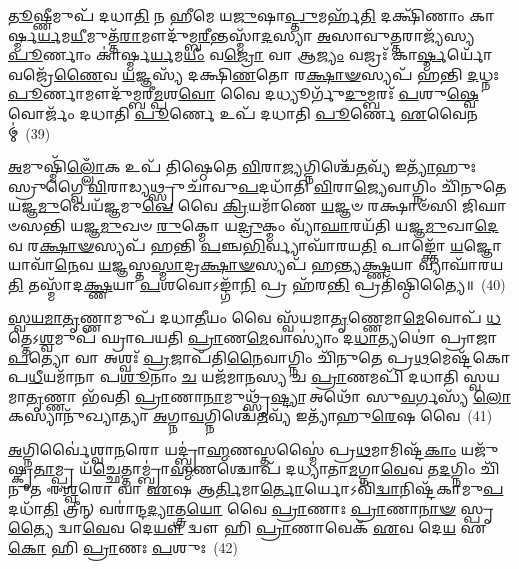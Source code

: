 \-\ul{𑌤𑍂}\-𑌷𑍍𑌣𑍀𑌮𑍁𑌪᳴ 𑌦𑌧𑌾\-\ul{𑌤𑌿} 𑌨 𑌹𑍀𑌮𑍇 𑌯\-\ul{𑌜𑍁}\-𑌷𑌾\-\ul{𑌪𑍍𑌤𑍁}\-𑌮𑌰𑍍\mbox{}𑌹᳴\-\ul{𑌤𑌿} 𑌦𑌕𑍍𑌷𑌿᳴𑌣𑌾𑌂 𑌕𑌾𑌰𑍍𑌷𑍍𑌮\-\ul{𑌰𑍍𑌯}\-𑌮\-\ul{𑌯𑍀}\-𑌮𑍁𑌤𑍍𑌤᳴\-\ul{𑌰𑌾}\-𑌮𑍗𑌦𑍁᳴𑌮𑍍𑌬\-\ul{𑌰𑍀}\-𑌨𑍍𑌤𑌸𑍍𑌮𑌾᳴\-\ul{𑌦}\-𑌸𑍍𑌯𑌾 \ul{𑌅}\-𑌸𑌾𑌵𑍁\-\ul{𑌤𑍍𑌤}\-𑌰𑌾𑌜𑍍𑌯᳴𑌸𑍍𑌯 \ul{𑌪𑍂}\-𑌰𑍍𑌣𑌾𑌂 𑌕𑌾॑𑌰𑍍𑌷𑍍𑌮\-\ul{𑌰𑍍𑌯}\-𑌮\-\ul{𑌯𑍀𑌂} 𑌵\-\ul{𑌜𑍍𑌰𑍋} 𑌵𑌾 𑌆\-\ul{𑌜𑍍𑌯𑌂} 𑌵𑌜𑍍𑌰𑌃᳴ 𑌕𑌾\-\ul{𑌰𑍍𑌷𑍍𑌮}\-𑌰𑍍𑌯𑍋᳴ 𑌵𑌜𑍍𑌰𑍇᳴\-\ul{𑌣𑍈}\-𑌵 \ul{𑌯}\-𑌜𑍍𑌞𑌸𑍍𑌯᳴ 𑌦𑌕𑍍𑌷𑌿\-\ul{𑌣}\-𑌤𑍋 𑌰\-\ul{𑌕𑍍𑌷𑌾}\-\-\ul{𑍟}\-𑌸𑍍𑌯𑌪᳴ 𑌹𑌨𑍍𑌤𑌿 \ul{𑌦}\-𑌧𑍍𑌨𑌃 \ul{𑌪𑍂}\-𑌰𑍍𑌣𑌾𑌮𑍗𑌦𑍁᳴𑌮𑍍𑌬𑌰𑍀\-\ul{𑌮𑍍𑌪}\-𑌶\-\ul{𑌵𑍋} 𑌵𑍈 𑌦𑌧𑍍𑌯𑍂𑌰𑍍𑌗𑍁᳴\-\ul{𑌦𑍁}\-𑌮𑍍𑌬𑌰𑌃᳴ \ul{𑌪}\-𑌶𑍁\-\ul{𑌷𑍍𑌵𑍇}\-𑌵𑍋𑌰𑍍𑌜𑌂᳴ 𑌦𑌧𑌾𑌤𑌿 \ul{𑌪𑍂}\-𑌰𑍍𑌣𑍇 𑌉𑌪᳴ 𑌦𑌧𑌾𑌤𑌿 \ul{𑌪𑍂}\-𑌰𑍍𑌣𑍇 \ul{𑌏}\-𑌵𑍈𑌨𑌮𑍍॑~(39)

\-\ul{𑌅}\-𑌮𑍁𑌷𑍍𑌮𑌿᳴\-\ul{𑌲𑍍𑌲𑍋𑌁}\-𑌕 𑌉𑌪᳴ 𑌤𑌿𑌷𑍍𑌠𑍇𑌤𑍇 \ul{𑌵𑌿}\-𑌰𑌾\-\ul{𑌜𑍍𑌯}\-𑌗𑍍𑌨𑌿𑌶𑍍𑌚𑍇᳴\-\ul{𑌤}\-𑌵𑍍𑌯᳴ 𑌇\-\ul{𑌤𑍍𑌯𑌾}\-᳴𑌹𑍁𑌃 𑌸𑍍𑌰𑍁𑌗𑍍𑌵𑍈 \ul{𑌵𑌿}\-𑌰𑌾𑌡𑍍𑌯𑌥𑍍𑌸𑍍𑌰𑍁𑌚𑌾᳴𑌵𑍁\-\ul{𑌪}\-𑌦𑌧𑌾᳴𑌤𑌿 \ul{𑌵𑌿}\-𑌰𑌾\-\ul{𑌜𑍍𑌯𑍇}\-𑌵𑌾𑌗𑍍𑌨𑌿𑌂 𑌚𑌿᳴𑌨𑍁𑌤𑍇 𑌯𑌜𑍍𑌞\-\ul{𑌮𑍁}\-𑌖𑍇𑌯᳴𑌜𑍍𑌞𑌮𑍁\-\ul{𑌖𑍇} 𑌵𑍈 \ul{𑌕𑍍𑌰𑌿}\-𑌯𑌮𑌾᳴𑌣𑍇 \ul{𑌯}\-𑌜𑍍𑌞𑍞 𑌰𑌕𑍍𑌷𑌾𑍞᳴𑌸𑌿 𑌜𑌿𑌘𑌾𑍞𑌸𑌨𑍍𑌤𑌿 𑌯𑌜𑍍𑌞\-\ul{𑌮𑍁}\-𑌖𑍞 \ul{𑌰𑍁}\-𑌕𑍍𑌮𑍋 𑌯\-\ul{𑌦𑍍𑌰𑍁}\-𑌕𑍍𑌮𑌂 𑌵𑍍𑌯𑌾᳴\-\ul{𑌘𑌾}\-𑌰𑌯᳴𑌤𑌿 𑌯𑌜𑍍𑌞\-\ul{𑌮𑍁}\-𑌖𑌾\-\ul{𑌦𑍇}\-𑌵 𑌰\-\ul{𑌕𑍍𑌷𑌾}\-\-\ul{𑍟}\-𑌸𑍍𑌯𑌪᳴ 𑌹𑌨𑍍𑌤𑌿 \ul{𑌪}\-𑌞𑍍𑌚\-\ul{𑌭𑌿}\-𑌰𑍍𑌵𑍍𑌯𑌾𑌘𑌾᳴𑌰𑌯\-\ul{𑌤𑌿} 𑌪𑌾𑌙𑍍𑌕𑍍𑌤𑍋᳴ \ul{𑌯}\-𑌜𑍍𑌞𑍋 𑌯𑌾𑌵𑌾᳴\-\ul{𑌨𑍇}\-𑌵 \ul{𑌯}\-𑌜𑍍𑌞𑌸𑍍𑌤\-\ul{𑌸𑍍𑌮𑌾}\-𑌦𑍍𑌰\-\ul{𑌕𑍍𑌷𑌾}\-\-\ul{𑍟}\-𑌸𑍍𑌯𑌪᳴ 𑌹𑌨𑍍𑌤𑍍𑌯\-\ul{𑌕𑍍𑌷𑍍𑌣}\-𑌯𑌾 𑌵𑍍𑌯𑌾𑌘𑌾᳴𑌰𑌯\-\ul{𑌤𑌿} 𑌤𑌸𑍍𑌮𑌾᳴𑌦\-\ul{𑌕𑍍𑌷𑍍𑌣}\-𑌯𑌾 \ul{𑌪}\-𑌶𑌵𑍋\-𑌽𑌙𑍍𑌗𑌾᳴\-\ul{𑌨𑌿} 𑌪𑍍𑌰 𑌹᳴𑌰\-\ul{𑌨𑍍𑌤𑌿} 𑌪𑍍𑌰𑌤𑌿᳴𑌷𑍍𑌠𑌿𑌤𑍍𑌯𑍈॥~(40)

{\anuvakamend[{𑌵\-\ul{𑌨}\-𑌸𑍍𑌪𑌤᳴𑌯𑍋 𑌦𑌕𑍍𑌷𑌿\-\ul{𑌣}\-𑌤𑍋 𑌧᳴𑌤𑍍𑌤 𑌏\-\ul{𑌨}\-𑌨𑍍𑌤𑌸𑍍𑌮𑌾᳴𑌦\-\ul{𑌕𑍍𑌷𑍍𑌣}\-𑌯𑌾 𑌪𑌞𑍍𑌚᳴ 𑌚}]}%

\-\ul{𑌸𑍍𑌵}\-\-\ul{𑌯}\-\-\ul{𑌮𑌾}\-\-\ul{𑌤𑍃}\-𑌣𑍍𑌣𑌾𑌮𑍁𑌪᳴ 𑌦𑌧𑌾\-\ul{𑌤𑍀}\-𑌯𑌂 𑌵𑍈 𑌸𑍍𑌵᳴𑌯𑌮𑌾\-\ul{𑌤𑍃}\-𑌣𑍍𑌣𑍇𑌮𑌾\-\ul{𑌮𑍇}\-𑌵𑍋𑌪᳴ \ul{𑌧}\-𑌤𑍍𑌤𑍇\-𑌽\-\ul{𑌶𑍍𑌵}\-𑌮𑍁𑌪᳴ 𑌘𑍍𑌰𑌾𑌪𑌯𑌤𑌿 \ul{𑌪𑍍𑌰𑌾}\-𑌣\-\ul{𑌮𑍇}\-𑌵𑌾𑌸𑍍𑌯𑌾𑌂॑ 𑌦\-\ul{𑌧𑌾}\-𑌤𑍍𑌯𑌥𑍋॑ 𑌪𑍍𑌰𑌾𑌜𑌾\-\ul{𑌪}\-𑌤𑍍𑌯𑍋 𑌵𑌾 𑌅𑌶𑍍𑌵𑌃᳴ \ul{𑌪𑍍𑌰}\-𑌜𑌾𑌪᳴𑌤𑌿\-\ul{𑌨𑍈}\-𑌵𑌾𑌗𑍍𑌨𑌿𑌂 𑌚𑌿᳴𑌨𑍁𑌤𑍇 𑌪𑍍𑌰\-\ul{𑌥}\-𑌮𑍇𑌷𑍍𑌟᳴𑌕𑍋𑌪\-\ul{𑌧𑍀}\-𑌯𑌮𑌾᳴𑌨𑌾 𑌪\-\ul{𑌶𑍂}\-𑌨𑌾𑌂 \ul{𑌚} 𑌯𑌜᳴𑌮𑌾𑌨𑌸𑍍𑌯 𑌚 \ul{𑌪𑍍𑌰𑌾}\-𑌣𑌮𑌪𑌿᳴ 𑌦𑌧𑌾𑌤𑌿 𑌸𑍍𑌵𑌯𑌮𑌾\-\ul{𑌤𑍃}\-𑌣𑍍𑌣𑌾 𑌭᳴𑌵𑌤𑌿 \ul{𑌪𑍍𑌰𑌾}\-𑌣𑌾\-\ul{𑌨𑌾}\-𑌮𑍁𑌥𑍍𑌸𑍃᳴\-\ul{𑌷𑍍𑌟𑍍𑌯𑌾} 𑌅𑌥𑍋᳴ 𑌸𑍁\-\ul{𑌵}\-𑌰𑍍𑌗𑌸𑍍𑌯᳴ \ul{𑌲𑍋}\-𑌕𑌸𑍍𑌯𑌾𑌨𑍁᳴𑌖𑍍𑌯𑌾𑌤𑍍𑌯𑌾 \ul{𑌅}\-𑌗𑍍𑌨𑌾\-\ul{𑌵}\-𑌗𑍍𑌨𑌿𑌶𑍍𑌚𑍇᳴\-\ul{𑌤}\-𑌵𑍍𑌯᳴ 𑌇𑌤𑍍𑌯𑌾᳴𑌹𑍁\-\ul{𑌰𑍇}\-𑌷 𑌵𑍈~(41)

\-\ul{𑌅}\-𑌗𑍍𑌨𑌿𑌰𑍍𑌵𑍈॑𑌶𑍍𑌵𑌾\-\ul{𑌨}\-𑌰𑍋 𑌯𑌦𑍍𑌬𑍍𑌰𑌾॑\-\ul{𑌹𑍍𑌮}\-𑌣𑌸𑍍𑌤𑌸𑍍𑌮𑍈॑ 𑌪𑍍𑌰\-\ul{𑌥}\-𑌮𑌾𑌮𑌿𑌷𑍍𑌟᳴\-\ul{𑌕𑌾𑌂} 𑌯𑌜𑍁᳴𑌷𑍍𑌕𑍃\-\ul{𑌤𑌾}\-𑌮𑍍𑌪𑍍𑌰 𑌯᳴\-\ul{𑌚𑍍𑌛𑍇}\-𑌤𑍍𑌤𑌾𑌮𑍍𑌬𑍍𑌰𑌾॑\-\ul{𑌹𑍍𑌮}\-𑌣𑌶𑍍𑌚𑍋𑌪᳴ 𑌦𑌧𑍍𑌯𑌾𑌤𑌾\-\ul{𑌮}\-𑌗𑍍𑌨𑌾\-\ul{𑌵𑍇}\-𑌵 𑌤\-\ul{𑌦}\-𑌗𑍍𑌨𑌿𑌂 𑌚𑌿᳴𑌨𑍁𑌤 𑌈\-\ul{𑌶𑍍𑌵}\-𑌰𑍋 𑌵𑌾 \ul{𑌏}\-𑌷 𑌆\-\ul{𑌰𑍍𑌤𑌿}\-𑌮𑌾\-\ul{𑌰𑍍𑌤𑍋}\-𑌰𑍍𑌯𑍋\-𑌽𑌵𑌿᳴\-\ul{𑌦𑍍𑌵𑌾}\-𑌨𑌿𑌷𑍍𑌟᳴𑌕𑌾𑌮𑍁\-\ul{𑌪}\-𑌦𑌧𑌾᳴\-\ul{𑌤𑌿} 𑌤𑍍𑌰𑍀𑌨𑍍 𑌵𑌰𑌾॑𑌨𑍍𑌦\-\ul{𑌦𑍍𑌯𑌾}\-𑌤𑍍𑌤𑍍𑌰\-\ul{𑌯𑍋} 𑌵𑍈 \ul{𑌪𑍍𑌰𑌾}\-𑌣𑌾𑌃 \ul{𑌪𑍍𑌰𑌾}\-𑌣𑌾\-\ul{𑌨𑌾}\-\-\ul{𑍟} 𑌸𑍍𑌪𑍃\-\ul{𑌤𑍍𑌯𑍈} 𑌦𑍍𑌵𑌾\-\ul{𑌵𑍇}\-𑌵 𑌦𑍇\-\ul{𑌯𑍗} 𑌦𑍍𑌵𑍗 𑌹𑌿 \ul{𑌪𑍍𑌰𑌾}\-𑌣𑌾𑌵𑍇𑌕᳴ \ul{𑌏}\-𑌵 𑌦𑍇\-\ul{𑌯} 𑌏\-\ul{𑌕𑍋} 𑌹𑌿 \ul{𑌪𑍍𑌰𑌾}\-𑌣𑌃 \ul{𑌪}\-𑌶𑍁𑌃~(42)

